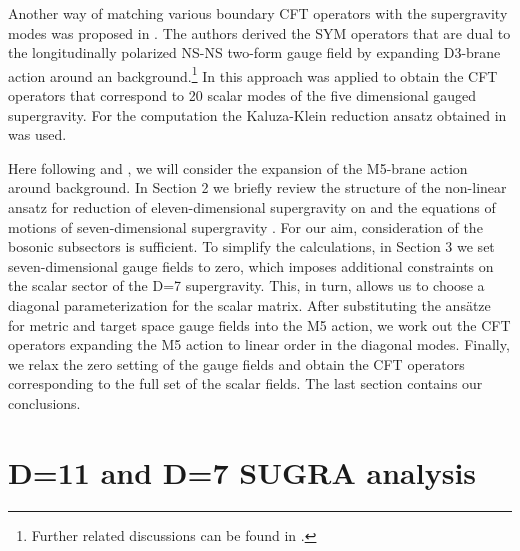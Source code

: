 \documentclass[a4paper,11pt]{article}
\begin{document}
Another way of matching various boundary CFT operators with the
supergravity modes was proposed in \cite{das}. The authors derived
the SYM operators that are dual to the longitudinally polarized
NS-NS two-form gauge field by expanding D3-brane action around an
\coordHE{} background.\footnote{Further related discussions
can be found in \cite{iyp,dt2,rr}.} In \cite{tran} this approach
was applied to obtain the CFT operators that correspond to 20
scalar modes of the five dimensional gauged supergravity. For the
computation the Kaluza-Klein reduction \cite{nieuw0,dnp} ansatz
obtained in \cite{clpst} was used.




Here following \cite{das} and \cite{tran}, we will consider the
expansion of the M5-brane action around \coordHE{}
background.  In Section 2 we briefly review the structure of the
non-linear ansatz for reduction of eleven-dimensional supergravity
on \coordHE{} and the equations of motions of seven-dimensional
supergravity \cite{nieuw,pope}. For our aim, consideration of the
bosonic subsectors is sufficient. To simplify the calculations, in
Section 3 we set seven-dimensional gauge fields to zero, which
imposes additional constraints on the scalar sector of the D=7
supergravity. This, in turn, allows us to choose a diagonal
parameterization for the scalar matrix. After substituting the
ans\"atze for metric and target space gauge fields into the M5
action, we work out the CFT operators expanding the M5 action to
linear order in the diagonal modes. Finally, we relax the zero
setting of the gauge fields and obtain the CFT operators
corresponding to the full set of the scalar fields. The last
section contains our conclusions.





\section{D=11 and D=7 SUGRA analysis}
\end{document}
